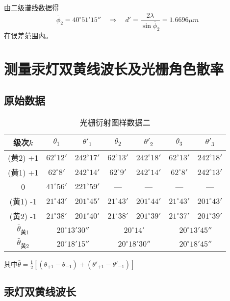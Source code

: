 \documentclass[12pt, a4paper]{ctexart}
\begin{document}
由二级谱线数据得
\[ \bar{\phi}_2 = 40^{\circ}51'15'' \quad \Rightarrow \quad d' = \frac{2\lambda}{\sin \bar{\phi}_2} = 1.6696 \mu m \]
在误差范围内。

\section{测量汞灯双黄线波长及光栅角色散率}
\subsection{原始数据}

\begin{table}[htbp]
  \centering
  \caption{光栅衍射图样数据二}
    \begin{tabular}{ccccccc}
    \toprule
    级次$k$   & $\theta_1$ & $\theta'_1$ & $\theta_2$ & $\theta'_2$ & $\theta_3$ & $\theta'_3$ \\
    \midrule
    (黄2) +1 & $62^{\circ}12'$ & $242^{\circ}17'$ & $62^{\circ}13'$ & $242^{\circ}18'$ & $62^{\circ}13'$ & $242^{\circ}18'$ \\
    (黄1) +1 & $62^{\circ}8'$ & $242^{\circ}14'$ & $62^{\circ}9'$ & $242^{\circ}14'$ & $62^{\circ}8'$ & $242^{\circ}13'$ \\
    0     & $41^{\circ}56'$ & $221^{\circ}59'$ & —     & —     & —     & — \\
    (黄1) -1 & $21^{\circ}43'$ & $201^{\circ}45'$ & $21^{\circ}43'$ & $201^{\circ}44'$ & $21^{\circ}43'$ & $201^{\circ}43'$ \\
    (黄2) -1 & $21^{\circ}38'$ & $201^{\circ}40'$ & $21^{\circ}38'$ & $201^{\circ}39'$ & $21^{\circ}37'$ & $201^{\circ}39'$ \\
    \midrule
    $\bar{\theta}_{黄1}$ & \multicolumn{2}{c}{$20^{\circ}13'30''$} & \multicolumn{2}{c}{$20^{\circ}14'$} & \multicolumn{2}{c}{$20^{\circ}13'45''$} \\
    $\bar{\theta}_{黄2}$ & \multicolumn{2}{c}{$20^{\circ}18'15''$} & \multicolumn{2}{c}{$20^{\circ}18'30''$} & \multicolumn{2}{c}{$20^{\circ}18'45''$} \\
    \bottomrule
    \end{tabular}
  \label{tab:t6}
\end{table}
其中$\bar{\theta} = \frac{1}{2} [(\theta_{+1} - \theta_{-1}) + (\theta'_{+1} - \theta'_{-1})]$

\subsection{汞灯双黄线波长}
\end{document}
